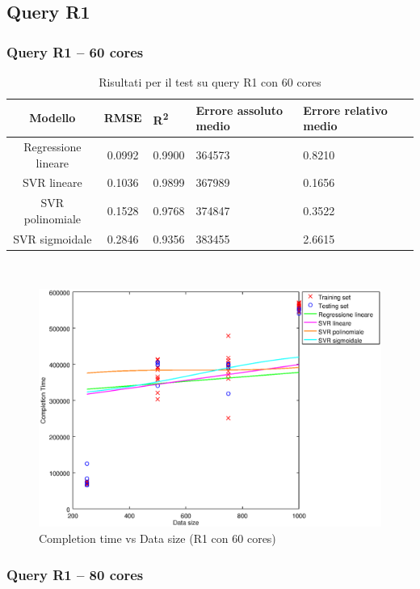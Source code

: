 \documentclass[a4paper,11pt]{article}
\begin{document}
\subsection{Query R1}
\subsubsection{Query R1 -- 60 cores}
\begin{table}[bhpt]
	\centering
	\begin{adjustbox}{center}
		\begin{tabular}{c | c M{1.2cm} M{2.5cm} M{2.5cm} M{1.8cm}}
			Modello & RMSE & R\textsuperscript{2} & Errore assoluto medio & Errore relativo medio \tabularnewline
			\hline
			Regressione lineare & 0.0992 & 0.9900 & 364573 & 0.8210 \\
			SVR lineare & 0.1036 & 0.9899 & 367989 & 0.1656 \\
			SVR polinomiale & 0.1528 & 0.9768 & 374847 & 0.3522 \\
			SVR sigmoidale & 0.2846 & 0.9356 & 383455 & 2.6615 \\
		\end{tabular}
	\end{adjustbox}
	\\
	\caption{Risultati per il test su query R1 con 60 cores}
	\label{table_R1_60cores}
\end{table}

\begin {figure}[hbtp]
\centering
\includegraphics[width=\textwidth]{output/R1_60CORES/plot_R1_60CORES.eps}
\caption {Completion time vs Data size (R1 con 60 cores)}
\end {figure}
\newpage
\subsubsection{Query R1 -- 80 cores}
\newpage
\end{document}
